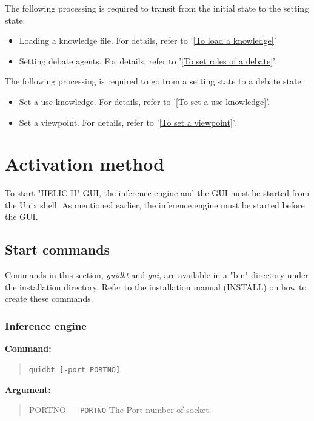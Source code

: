 The following processing is required to transit from the initial state to the setting state:
\begin{itemize}
\item Loading a knowledge file.
For details, refer to '\ref{To load a knowledge}'
\item Setting debate agents.
For details, refer to '\ref{To set roles of a debate}'.
\end{itemize}

The following processing is required to go from a setting state to a debate state:
\begin{itemize}
\item Set a use knowledge.
For details, refer to '\ref{To set a use knowledge}'.
\item Set a viewpoint.
For details, refer to '\ref{To set a viewpoint}'.
\end{itemize}

\section{Activation method}\label{Activation method}

To start "HELIC-II" GUI, the inference engine and the GUI must be started from the Unix shell.
As mentioned earlier, the inference engine must be started before the GUI. 

\subsection{Start commands}

Commands in this section, {\sl guidbt} and {\sl gui}, are available in a "bin" directory under the installation directory.
Refer to the installation manual (INSTALL) on how to create these commands.

\subsubsection{Inference engine}

{\bf Command:}
\begin{quote}
\verb+guidbt [-port PORTNO]+
\end{quote}

{\bf Argument:}
\begin{quote}
\begin{tabbing}
PORTNO \ \ \= \kill
\verb+PORTNO+ \> The Port number of socket.\\
\end{tabbing}
\end{quote}

